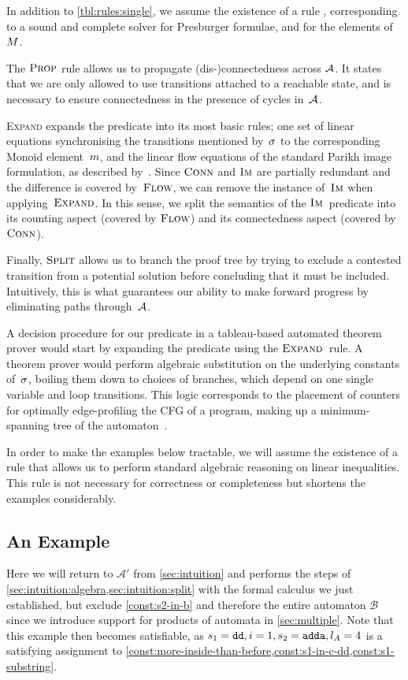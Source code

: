 In addition to \cref{tbl:rules:single}, we assume the existence of a rule
\PresburgerClose{}, corresponding to a sound and complete solver for Presburger
formulae, and for the elements of~$M$.

The $\textsc{Prop}{}$ rule allows us to propagate (dis-)connectedness across
$\mathcal{A}$. It states that we are only allowed to use transitions attached to
a reachable state, and is necessary to ensure connectedness in the presence of
cycles in~$\mathcal{A}$.

\textsc{Expand} expands the predicate into its most basic rules; one set of
linear equations synchronising the transitions mentioned by~$\operatorname{\sigma}$ to the
corresponding Monoid element~$m$, and the linear flow equations of
the standard Parikh image formulation, as described by~\FlowEq. Since
$\operatorname{\textsc{Conn}}$ and $\operatorname{\textsc{Im}}$ are partially redundant and the difference is covered
by~$\textsc{Flow}$, we can remove the instance of~$\operatorname{\textsc{Im}}$ when applying~$\textsc{Expand}$. In
this sense, we split the semantics of the $\operatorname{\textsc{Im}}$~predicate into its counting
aspect (covered by $\textsc{Flow}$) and its connectedness aspect (covered by
$\operatorname{\textsc{Conn}}$).

Finally, $\textsc{Split}{}$ allows us to branch the proof tree by trying to exclude a
contested transition from a potential solution before concluding that it must be
included. Intuitively, this is what guarantees our ability to make forward
progress by eliminating paths through~$\mathcal{A}$.

A decision procedure for our predicate in a tableau-based automated theorem
prover would start by expanding the predicate using the $\textsc{Expand}{}$~rule. A
theorem prover would perform algebraic substitution on the underlying constants
of~$\operatorname{\sigma}$, boiling them down to choices of branches, which depend on one
single variable and loop transitions. This logic corresponds to the placement
of counters for optimally edge-profiling the CFG of a program, making up a
minimum-spanning tree of the automaton~\cite{path-profiling}.

In order to make the examples below tractable, we will assume the existence of a
rule \EquationReasoning{} that allows us to perform standard algebraic reasoning
on linear inequalities. This rule is not necessary for correctness or
completeness but shortens the examples considerably.

\subsection{An Example}\label{sec:single:example}
Here we will return to $\mathcal{A}'$ from \cref{sec:intuition} and performs the steps of
\cref{sec:intuition:algebra,sec:intuition:split} with the
formal calculus we just established, but exclude \cref{const:s2-in-b} and
therefore the entire automaton $\mathcal{B}$ since we introduce support for products of
automata in \cref{sec:multiple}. Note that this example then becomes
satisfiable, as $s_1 = \texttt{dd}, i = 1, s_2 = \texttt{adda}, l_A = 4$ is a
satisfying assignment to
\cref{const:more-inside-than-before,const:s1-in-c-dd,const:s1-substring}.

